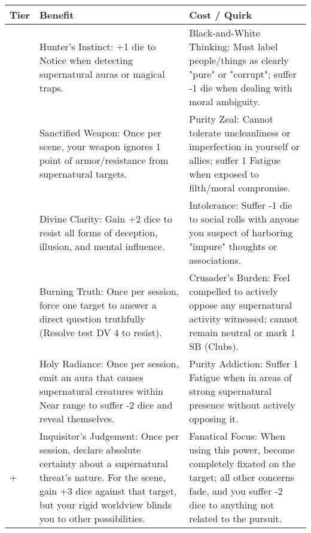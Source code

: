 \begin{longtable}{>{\raggedright\arraybackslash}p{1cm} p{5cm} p{5cm}}
\toprule
\textbf{Tier} & \textbf{Benefit} & \textbf{Cost / Quirk} \\
\midrule
1 & Hunter's Instinct: +1 die to Notice when detecting supernatural auras or magical traps. & Black-and-White Thinking: Must label people/things as clearly "pure" or "corrupt"; suffer -1 die when dealing with moral ambiguity. \\
\midrule
2 & Sanctified Weapon: Once per scene, your weapon ignores 1 point of armor/resistance from supernatural targets. & Purity Zeal: Cannot tolerate uncleanliness or imperfection in yourself or allies; suffer 1 Fatigue when exposed to filth/moral compromise. \\
\midrule
3 & Divine Clarity: Gain +2 dice to resist all forms of deception, illusion, and mental influence. & Intolerance: Suffer -1 die to social rolls with anyone you suspect of harboring "impure" thoughts or associations. \\
\midrule
4 & Burning Truth: Once per session, force one target to answer a direct question truthfully (Resolve test DV 4 to resist). & Crusader's Burden: Feel compelled to actively oppose any supernatural activity witnessed; cannot remain neutral or mark 1 SB (Clubs). \\
\midrule
5 & Holy Radiance: Once per session, emit an aura that causes supernatural creatures within Near range to suffer -2 dice and reveal themselves. & Purity Addiction: Suffer 1 Fatigue when in areas of strong supernatural presence without actively opposing it. \\
\midrule
6+ & Inquisitor's Judgement: Once per session, declare absolute certainty about a supernatural threat's nature. For the scene, gain +3 dice against that target, but your rigid worldview blinds you to other possibilities. & Fanatical Focus: When using this power, become completely fixated on the target; all other concerns fade, and you suffer -2 dice to anything not related to the pursuit. \\
\bottomrule
\end{longtable}